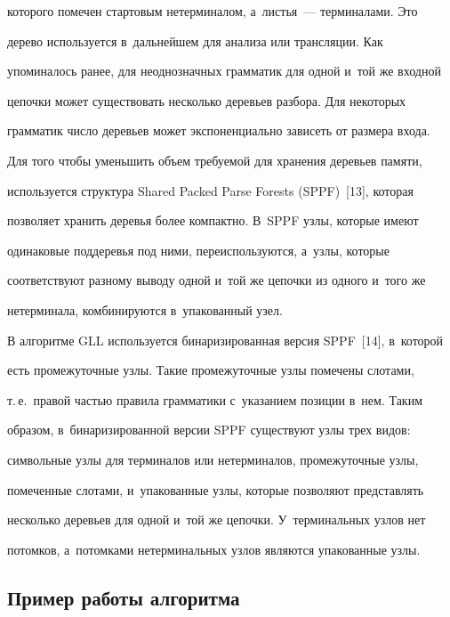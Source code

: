 которого помечен стартовым нетерминалом, а~листья~--- терминалами. Это


дерево используется в~дальнейшем для анализа или трансляции. Как


упоминалось ранее, для неоднозначных грамматик для одной и~той же входной


цепочки может существовать несколько деревьев разбора. Для некоторых


грамматик число деревьев может экспоненциально зависеть от размера входа.


Для того чтобы уменьшить объем требуемой для хранения деревьев памяти,


используется структура Shared Packed Parse Forests (SPPF)~[13], которая


позволяет хранить деревья более компактно. В~SPPF узлы, которые имеют


одинаковые поддеревья под ними, переиспользуются, а~узлы, которые


соответствуют разному выводу одной и~той же цепочки из одного и~того же


нетерминала, комбинируются в~упакованный узел.





В алгоритме GLL используется бинаризированная версия SPPF~[14], в~которой


есть промежуточные узлы. Такие промежуточные узлы помечены слотами,


т.\,е.\ правой частью правила грамматики с~указанием позиции в~нем. Таким


образом, в~бинаризированной версии SPPF существуют узлы трех видов:


символьные узлы для терминалов или нетерминалов, промежуточные узлы,


помеченные слотами, и~упакованные узлы, которые позволяют представлять


несколько деревьев для одной и~той же цепочки. У~терминальных узлов нет


потомков, а~потомками нетерминальных узлов являются упакованные узлы.





\subsection{Пример работы алгоритма}





